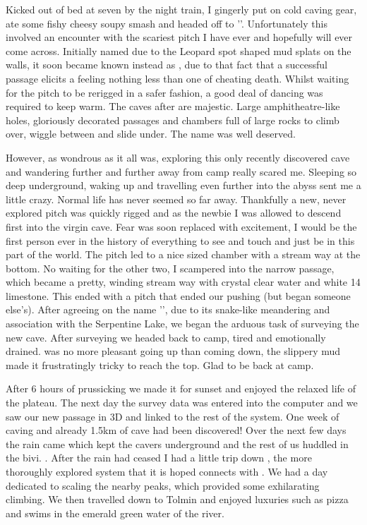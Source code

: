 Kicked out of bed at seven by the night train, I gingerly put on cold caving gear, ate some fishy
cheesy soupy smash and headed off to ''. Unfortunately this involved an encounter with
the scariest pitch I have ever and hopefully will ever come across. Initially named  due to the
Leopard spot shaped mud splats on the walls, it soon became known instead as , due to that
fact that a successful passage elicits a feeling nothing less than one of cheating death. Whilst waiting
for the pitch to be rerigged in a safer fashion, a good deal of dancing was required to keep warm. The
caves after  are majestic. Large amphitheatre-like holes, gloriously decorated passages and
chambers full of large rocks to climb over, wiggle between and slide under. The name  was
well deserved.


However, as wondrous as it all was, exploring this only recently discovered cave and wandering
further and further away from camp really scared me. Sleeping so deep underground, waking up and
travelling even further into the abyss sent me a little crazy. Normal life has never seemed so far away.
Thankfully a new, never explored pitch was quickly rigged and as the newbie I was allowed to descend
first into the virgin cave. Fear was soon replaced with excitement, I would be the first person ever in
the history of everything to see and touch and just be in this part of the world. The pitch led to a
nice sized chamber with a stream way at the bottom. No waiting for the other two, I scampered into
the narrow passage, which became a pretty, winding stream way with crystal clear water and white
14
limestone. This ended with a pitch that ended our pushing (but began someone else's). After agreeing
on the name '', due to its snake-like meandering and association with the Serpentine Lake,
we began the arduous task of surveying the new cave. After surveying we headed back to camp, tired
and emotionally drained.  was no more pleasant going up than coming down, the slippery
mud made it frustratingly tricky to reach the top. Glad to be back at camp.


After 6 hours of prussicking we made it for sunset and enjoyed the relaxed life of the plateau. The
next day the survey data was entered into the computer and we saw our new passage in 3D and linked
to the rest of the system. One week of caving and already 1.5km of cave had been discovered! Over the
next few days the rain came which kept the cavers underground and the rest of us huddled in the bivi.
. After the rain had ceased I had a little trip
down , the more thoroughly explored system that it is hoped connects with .
We had a day dedicated to scaling the nearby peaks, which provided some exhilarating climbing. We
then travelled down to Tolmin and enjoyed luxuries such as pizza and swims in the emerald green
water of the  river.


